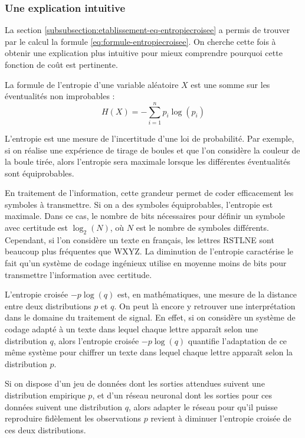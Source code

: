 \subsubsection{Une explication intuitive}

La section \ref{subsubsection:etablissement-eq-entropiecroisee} a permis de trouver par le calcul la formule \ref{eq:formule-entropiecroisee}.
On cherche cette fois à obtenir une explication plus intuitive pour mieux comprendre pourquoi cette fonction de coût est pertinente.

La formule de l'entropie d'une variable aléatoire $X$ est une somme sur les éventualités non improbables :
\begin{equation}
 H(X) = -\sum_{i=1}^{n} p_i\log\left(p_i\right)
\end{equation}

L'entropie est une mesure de l'incertitude d'une loi de probabilité. Par exemple, si on réalise une expérience de tirage de boules et que l'on considère la couleur de la boule tirée, alors l'entropie sera maximale lorsque les différentes éventualités sont équiprobables.

En traitement de l'information, cette grandeur permet de coder efficacement les symboles à transmettre. Si on a des symboles équiprobables, l'entropie est maximale. Dans ce cas, le nombre de bits nécessaires pour définir un symbole avec certitude est $\log_2\left(N\right)$, où $N$ est le nombre de symboles différents. Cependant, si l'on considère un texte en français, les lettres RSTLNE sont beaucoup plus fréquentes que WXYZ. La diminution de l'entropie caractérise le fait qu'un système de codage ingénieux utilise en moyenne moins de bits pour transmettre l'information avec certitude.

L'entropie croisée $-p\log\left(q\right)$ est, en mathématiques, une mesure de la distance entre deux distributions $p$ et $q$. On peut là encore y retrouver une interprétation dans le domaine du traitement de signal.
En effet, si on considère un système de codage adapté à un texte dans lequel chaque lettre apparaît selon une distribution $q$, alors
l'entropie croisée $-p\log\left(q\right)$ quantifie l'adaptation de ce même système pour chiffrer un texte dans lequel chaque lettre apparaît selon la distribution $p$.

Si on dispose d'un jeu de données dont les sorties attendues suivent une distribution empirique $p$, et d'un réseau neuronal dont les sorties pour ces données suivent une distribution $q$, alors adapter le réseau pour qu'il puisse reproduire fidèlement les observations $p$ revient à diminuer l'entropie croisée de ces deux distributions.

